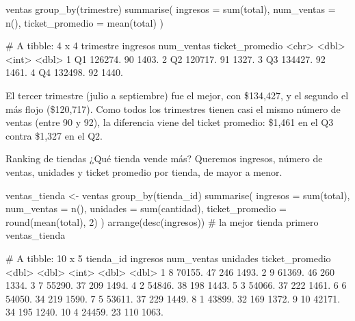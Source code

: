 \begin{rcode}
ventas %
  group_by(trimestre) %
  summarise(
    ingresos        = sum(total),
    num_ventas      = n(),
    ticket_promedio = mean(total)
  )
\end{rcode}
\begin{rsalida}
# A tibble: 4 x 4
  trimestre ingresos num_ventas ticket_promedio
  <chr>        <dbl>      <int>           <dbl>
1 Q1         126274.         90           1403.
2 Q2         120717.         91           1327.
3 Q3         134427.         92           1461.
4 Q4         132498.         92           1440.
\end{rsalida}

El tercer trimestre (julio a septiembre) fue el mejor, con \$134,427, y el
segundo el más flojo (\$120,717). Como todos los trimestres tienen casi el
mismo número de ventas (entre 90 y 92), la diferencia viene del ticket
promedio: \$1,461 en el Q3 contra \$1,327 en el Q2.

\begin{ejemplo}{Ranking de tiendas}
¿Qué tienda vende más? Queremos ingresos, número de ventas, unidades y
ticket promedio por tienda, de mayor a menor.
\end{ejemplo}

\begin{rcode}
ventas_tienda <- ventas %
  group_by(tienda_id) %
  summarise(
    ingresos        = sum(total),
    num_ventas      = n(),
    unidades        = sum(cantidad),
    ticket_promedio = round(mean(total), 2)
  ) %
  arrange(desc(ingresos))                 # la mejor tienda primero
ventas_tienda
\end{rcode}
\begin{rsalida}
# A tibble: 10 x 5
   tienda_id ingresos num_ventas unidades ticket_promedio
       <dbl>    <dbl>      <int>    <dbl>           <dbl>
 1         8   70155.         47      246           1493.
 2         9   61369.         46      260           1334.
 3         7   55290.         37      209           1494.
 4         2   54846.         38      198           1443.
 5         3   54066.         37      222           1461.
 6         6   54050.         34      219           1590.
 7         5   53611.         37      229           1449.
 8         1   43899.         32      169           1372.
 9        10   42171.         34      195           1240.
10         4   24459.         23      110           1063.
\end{rsalida}

